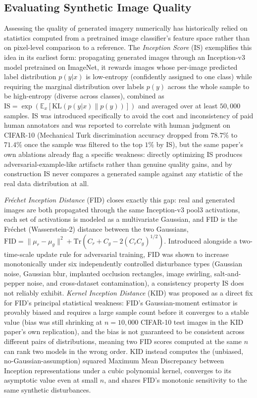\subsection{Evaluating Synthetic Image Quality}\label{sec:lit_synthetic_evaluation}

Assessing the quality of generated imagery numerically has historically relied on statistics computed from a pretrained image classifier's feature space rather than on pixel-level comparison to a reference. The \textit{Inception Score} (IS) \cite{salimansImprovedTechniquesTraining2016} exemplifies this idea in its earliest form: propagating generated images through an Inception-v3 model pretrained on ImageNet, it rewards images whose per-image predicted label distribution $p(y|x)$ is low-entropy (confidently assigned to one class) while requiring the marginal distribution over labels $p(y)$ across the whole sample to be high-entropy (diverse across classes), combined as $\mathrm{IS} = \exp(\mathbb{E}_x[\mathrm{KL}(p(y|x) \| p(y))])$ and averaged over at least $50{,}000$ samples. IS was introduced specifically to avoid the cost and inconsistency of paid human annotators and was reported to correlate with human judgment on CIFAR-10 (Mechanical Turk discrimination accuracy dropped from $78.7\%$ to $71.4\%$ once the sample was filtered to the top $1\%$ by IS), but the same paper's own ablations already flag a specific weakness: directly optimizing IS produces adversarial-example-like artifacts rather than genuine quality gains, and by construction IS never compares a generated sample against any statistic of the real data distribution at all.

\textit{Fréchet Inception Distance} (FID) \cite{heuselGANsTrainedTwo2018} closes exactly this gap: real and generated images are both propagated through the same Inception-v3 pool3 activations, each set of activations is modeled as a multivariate Gaussian, and FID is the Fréchet (Wasserstein-2) distance between the two Gaussians, $\mathrm{FID} = \|\mu_r - \mu_g\|^2 + \mathrm{Tr}(C_r + C_g - 2(C_r C_g)^{1/2})$. Introduced alongside a two-time-scale update rule for adversarial training, FID was shown to increase monotonically under six independently controlled disturbance types (Gaussian noise, Gaussian blur, implanted occlusion rectangles, image swirling, salt-and-pepper noise, and cross-dataset contamination), a consistency property IS does not reliably exhibit. \textit{Kernel Inception Distance} (KID) \cite{binkowskiDemystifyingMMDGANs2021} was proposed as a direct fix for FID's principal statistical weakness: FID's Gaussian-moment estimator is provably biased and requires a large sample count before it converges to a stable value (bias was still shrinking at $n=10{,}000$ CIFAR-10 test images in the KID paper's own replication), and the bias is not guaranteed to be consistent across different pairs of distributions, meaning two FID scores computed at the same $n$ can rank two models in the wrong order. KID instead computes the (unbiased, no-Gaussian-assumption) squared Maximum Mean Discrepancy between Inception representations under a cubic polynomial kernel, converges to its asymptotic value even at small $n$, and shares FID's monotonic sensitivity to the same synthetic disturbances.

